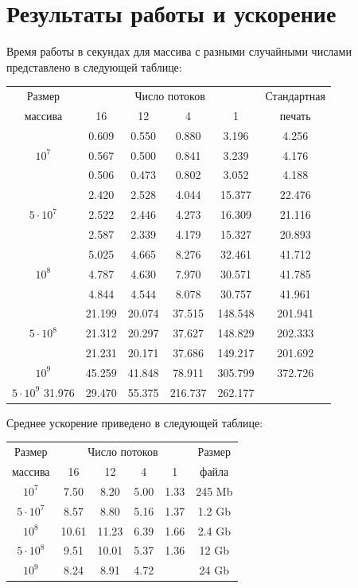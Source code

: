 \documentclass[specialist,subf,href,colorlinks=true,14pt
,times,mtpro,specialist
]{disser}
\begin{document}
\section{Результаты работы и ускорение}
Время работы в секундах для массива с разными случайными числами представлено в следующей таблице:
\begin{center}
\begin{tabular}{||c|c|c|c|c|c||}
\hline
\hline
Размер & \multicolumn{4}{c|}{Число потоков} & Стандартная\\
\hhline{~|-|-|-|-|~|}
массива & 16 & 12 & 4 & 1 & печать \\
\hline
\hline
& 0.609 & 0.550 & 0.880 & 3.196 & 4.256 \\
\hhline{~|-|-|-|-|-|}
$10^7$ & 0.567 & 0.500 & 0.841 & 3.239 & 4.176 \\
\hhline{~|-|-|-|-|-|}
& 0.506 &0.473 & 0.802 & 3.052 & 4.188 \\
\hline
& 2.420 & 2.528 & 4.044 & 15.377 & 22.476 \\
\hhline{~|-|-|-|-|-|}
$5 \cdot 10^7$  & 2.522 & 2.446 & 4.273 & 16.309 & 21.116\\
\hhline{~|-|-|-|-|-|}
& 2.587 & 2.339 & 4.179 & 15.327 & 20.893 \\
\hline
& 5.025 & 4.665 & 8.276 & 32.461 & 41.712 \\
\hhline{~|-|-|-|-|-|}
$10^8$  & 4.787 & 4.630 & 7.970 & 30.571 & 41.785 \\
\hhline{~|-|-|-|-|-|}
& 4.844 & 4.544 & 8.078 & 30.757 & 41.961 \\
\hline
& 21.199 & 20.074 & 37.515 & 148.548 & 201.941 \\
\hhline{~|-|-|-|-|-|}
$5 \cdot 10^8$  & 21.312 & 20.297 & 37.627 & 148.829 & 202.333 \\
\hhline{~|-|-|-|-|-|}
 & 21.231 & 20.171 & 37.686 & 149.217 & 201.692 \\
\hline
$10^9$ & 45.259 & 41.848 & 78.911 & 305.799 & 372.726 \\
\hline
$5 \cdot 10^9$ 31.976 & 29.470 & 55.375 & 216.737 & 262.177 \\
\hline
\hline
\end{tabular}
\end{center}
Среднее ускорение приведено в следующей таблице:
\begin{center}
\begin{tabular}{||c|c|c|c|c|c||}
\hline
\hline
Размер & \multicolumn{4}{c|}{Число потоков} & Размер\\
\hhline{~|-|-|-|-|~|}
массива & 16 & 12 & 4 & 1 & файла \\
\hline
$10^7$ & 7.50 & 8.20 & 5.00 & 1.33 & 245 Mb \\
\hline
$5 \cdot 10^7$ & 8.57 & 8.80 & 5.16 & 1.37 & 1.2 Gb \\
\hline
$10^8$ & 10.61 & 11.23 & 6.39 & 1.66 & 2.4 Gb\\
\hline
$5 \cdot 10^8$ & 9.51 & 10.01 & 5.37 & 1.36 & 12 Gb \\
\hline
$10^9$ & 8.24 & 8.91 & 4.72 &  & 24 Gb \\
\hline
\hline
\end{tabular}
\end{center}
\end{document}
